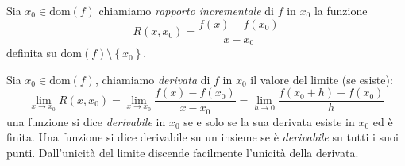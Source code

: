 \documentclass[11pt]{scrartcl}
\begin{document}
	\begin{definition}
		Sia $x_0\in\text{dom}(f)$ chiamiamo \textit{rapporto incrementale} di $f$ in $x_0$ la funzione 
		$$R(x,x_0)=\frac{f(x)-f(x_0)}{x-x_0}$$
		definita su $\text{dom}(f)\setminus\left\{x_0\right\}$.
	\end{definition}
	\begin{definition}[Derivata]
		Sia $x_0\in\text{dom}(f)$, chiamiamo \textit{derivata} di $f$ in $x_0$ il valore del limite (se esiste):
		$$\lim_{x\to x_0}R(x,x_0)=\lim_{x\to x_0}\frac{f(x)-f(x_0)}{x-x_0}=\lim_{h\to 0}\frac{f(x_0+h)-f(x_0)}{h}$$
		una funzione si dice \textit{derivabile} in $x_0$ se e solo se la sua derivata esiste in $x_0$ ed è finita. Una funzione si dice derivabile su un insieme se è \textit{derivabile} su tutti i suoi punti. Dall'unicità del limite discende facilmente l'unicità della derivata.
	\end{definition}
	
\end{document}
